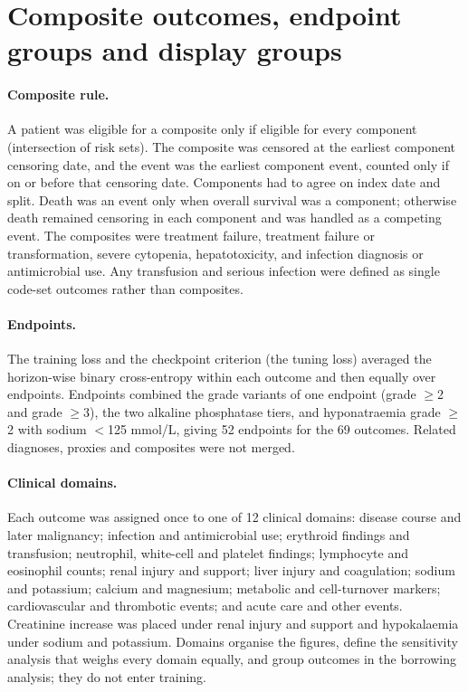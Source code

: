 \documentclass[10pt]{article}
\begin{document}
\section{Composite outcomes, endpoint groups and display groups}\label{sec:composites}

\paragraph{Composite rule.} A patient was eligible for a composite only if
eligible for every component (intersection of risk sets). The composite was
censored at the earliest component censoring date, and the event was the
earliest component event, counted only if on or before that censoring date.
Components had to agree on index date and split. Death was an event only when
overall survival was a component; otherwise death remained censoring in each
component and was handled as a competing event. The composites were treatment
failure, treatment failure or transformation, severe cytopenia, hepatotoxicity,
and infection diagnosis or antimicrobial use. Any transfusion and serious
infection were defined as single code-set outcomes rather than composites.

\paragraph{Endpoints.} The training loss and the checkpoint criterion (the
tuning loss) averaged the horizon-wise binary cross-entropy within each outcome
and then equally over endpoints. Endpoints combined the
grade variants of one endpoint (grade $\ge$2 and grade $\ge$3), the two
alkaline phosphatase tiers, and hyponatraemia grade $\ge$2 with sodium
$<$125 mmol/L, giving 52 endpoints for the 69 outcomes. Related
diagnoses, proxies and composites were not merged.

\paragraph{Clinical domains.} Each outcome was assigned once to one of 12
clinical domains: disease course and later malignancy; infection and
antimicrobial use; erythroid findings and transfusion; neutrophil, white-cell and
platelet findings; lymphocyte and eosinophil counts; renal injury and support;
liver injury and coagulation; sodium and potassium; calcium and magnesium;
metabolic and cell-turnover markers; cardiovascular and thrombotic events; and
acute care and other events. Creatinine increase was placed under renal injury
and support and hypokalaemia under sodium and potassium. Domains organise the
figures, define the sensitivity analysis that weighs every domain equally, and
group outcomes in the borrowing analysis; they do not enter training.
\end{document}
